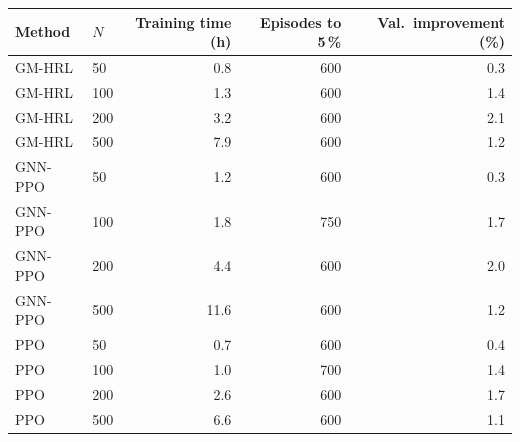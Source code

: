 \begin{tabular}{llrrr}
\toprule
Method & $N$ & Training time (h) & Episodes to 5\,\% & Val.\ improvement (\%) \\
\midrule
GM-HRL & 50 & 0.8 & 600 & 0.3 \\
GM-HRL & 100 & 1.3 & 600 & 1.4 \\
GM-HRL & 200 & 3.2 & 600 & 2.1 \\
GM-HRL & 500 & 7.9 & 600 & 1.2 \\
GNN-PPO & 50 & 1.2 & 600 & 0.3 \\
GNN-PPO & 100 & 1.8 & 750 & 1.7 \\
GNN-PPO & 200 & 4.4 & 600 & 2.0 \\
GNN-PPO & 500 & 11.6 & 600 & 1.2 \\
PPO & 50 & 0.7 & 600 & 0.4 \\
PPO & 100 & 1.0 & 700 & 1.4 \\
PPO & 200 & 2.6 & 600 & 1.7 \\
PPO & 500 & 6.6 & 600 & 1.1 \\
\bottomrule
\end{tabular}
